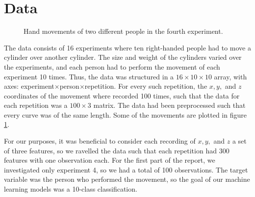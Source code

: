 \documentclass[11pt,fleqn]{article}
\begin{document}
\section{Data}
\begin{figure}[H]
	\centering
	\label{fig:trajects}
	\caption{Hand movements of two different people in the fourth experiment.}
\end{figure}
The data consists of 16 experiments where ten right-handed people had to move a cylinder over another cylinder.
The size and weight of the cylinders varied over the experiments, and each person had to perform the movement of each experiment 10 times.
Thus, the data was structured in a $ 16\times 10\times 10 $ array, with axes: experiment\(\times\)person\(\times\)repetition.
For every such repetition, the $ x, y, $ and $ z $ coordinates of the movement where recorded 100 times, such that the data for each repetition was a $ 100\times 3 $ matrix.
The data had been preprocessed such that every curve was of the same length.
Some of the movements are plotted in figure \ref{fig:trajects}.

For our purposes, it was beneficial to consider each recording of $ x, y, $ and $ z $ a set of three features, so we ravelled the data such that each repetition had $ 300 $ features with one observation each.
For the first part of the report, we investigated only experiment 4, so we had a total of 100 observations.
The target variable was the person who performed the movement, so the goal of our machine learning models was a 10-class classification.
\end{document}
